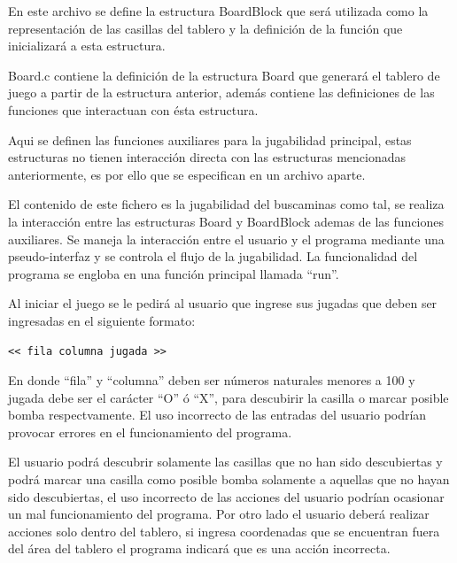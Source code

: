 \documentclass[letterpaper,12pt]{report}
\begin{document}
\begin{description}[align=left]

\item [`` \string ~ ''] 
    En este archivo se define la estructura BoardBlock que será utilizada como la representación de las casillas del tablero y la definición de la función que inicializará a esta estructura. 

\item [`` ' '':]
    Board.c contiene la definición de la estructura Board que generará el tablero de juego a partir de la estructura anterior, además contiene las definiciones de las funciones que interactuan con ésta estructura.

\item [`` * '':]
    Aqui se definen las funciones auxiliares para la jugabilidad principal, estas estructuras no tienen interacción directa con las estructuras mencionadas anteriormente, es por ello que se especifican en un archivo aparte.

\item [número:]
    El contenido de este fichero es la jugabilidad del buscaminas como tal, se realiza la interacción entre las estructuras Board y BoardBlock ademas de las funciones auxiliares. Se maneja la interacción entre el usuario y el programa mediante una pseudo-interfaz y se controla el flujo de la jugabilidad. La funcionalidad del programa se engloba en una función principal llamada ``run''.

\end{description}

Al iniciar el juego se le pedirá al usuario que ingrese sus jugadas que deben ser ingresadas en el siguiente formato:

\begin{lstlisting}[language=txt]
<< fila columna jugada >>
\end{lstlisting}

En donde ``fila'' y ``columna'' deben ser números naturales menores a 100 y jugada debe ser el carácter ``O'' ó ``X'', para descubirir la casilla o marcar posible bomba respectvamente. El uso incorrecto de las entradas del usuario podrían provocar errores en el funcionamiento del programa.

El usuario podrá descubrir solamente las casillas que no han sido descubiertas y podrá marcar una casilla como posible bomba solamente a aquellas que no hayan sido descubiertas, el uso incorrecto de las acciones del usuario podrían ocasionar un mal funcionamiento del programa. Por otro lado el usuario deberá realizar acciones solo dentro del tablero, si ingresa coordenadas que se encuentran fuera del área del tablero el programa indicará que es una acción incorrecta.
\end{document}
